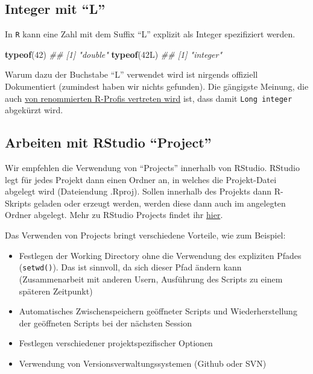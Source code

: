 \documentclass[]{book}
\newenvironment{Shaded}{\begin{snugshade}}{\end{snugshade}}
\newcommand{\CommentTok}[1]{\textcolor[rgb]{0.56,0.35,0.01}{\textit{#1}}}
\newcommand{\DecValTok}[1]{\textcolor[rgb]{0.00,0.00,0.81}{#1}}
\newcommand{\KeywordTok}[1]{\textcolor[rgb]{0.13,0.29,0.53}{\textbf{#1}}}
\newcommand{\NormalTok}[1]{#1}
\providecommand{\tightlist}{%
  \setlength{\itemsep}{0pt}\setlength{\parskip}{0pt}}
\begin{document}
\hypertarget{integer-mit-l}{%
\subsection{Integer mit ``L''}\label{integer-mit-l}}

In \texttt{R} kann eine Zahl mit dem Suffix ``L'' explizit als Integer spezifiziert werden.

\begin{Shaded}
\begin{Highlighting}[]
\KeywordTok{typeof}\NormalTok{(}\DecValTok{42}\NormalTok{)}
\CommentTok{## [1] "double"}
\KeywordTok{typeof}\NormalTok{(42L)}
\CommentTok{## [1] "integer"}
\end{Highlighting}
\end{Shaded}

Warum dazu der Buchstabe ``L'' verwendet wird ist nirgends offiziell Dokumentiert (zumindest haben wir nichts gefunden). Die gängigste Meinung, die auch \href{https://hypatia.math.ethz.ch/pipermail/r-devel/2017-June/074467.html}{von renommierten R-Profis vertreten wird} ist, dass damit \texttt{Long\ integer} abgekürzt wird.

\hypertarget{arbeiten-mit-rstudio-project}{%
\subsection{Arbeiten mit RStudio ``Project''}\label{arbeiten-mit-rstudio-project}}

Wir empfehlen die Verwendung von ``Projects'' innerhalb von RStudio. RStudio legt für jedes Projekt dann einen Ordner an, in welches die Projekt-Datei abgelegt wird (Dateiendung .Rproj). Sollen innerhalb des Projekts dann R-Skripts geladen oder erzeugt werden, werden diese dann auch im angelegten Ordner abgelegt. Mehr zu RStudio Projects findet ihr \href{https://support.rstudio.com/hc/en-us/articles/200526207-Using-Projects}{hier}.

Das Verwenden von Projects bringt verschiedene Vorteile, wie zum Beispiel:

\begin{itemize}
\tightlist
\item
  Festlegen der Working Directory ohne die Verwendung des expliziten Pfades (\texttt{setwd()}). Das ist sinnvoll, da sich dieser Pfad ändern kann (Zusammenarbeit mit anderen Usern, Ausführung des Scripts zu einem späteren Zeitpunkt)
\item
  Automatisches Zwischenspeichern geöffneter Scripts und Wiederherstellung der geöffneten Scripts bei der nächsten Session
\item
  Festlegen verschiedener projektspezifischer Optionen
\item
  Verwendung von Versionsverwaltungssystemen (Github oder SVN)
\end{itemize}
\end{document}
